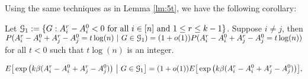 \documentclass{article}
\begin{document}
Using the same techniques as in Lemma \ref{lm:5t}, we have the following corollary:
\begin{corollary}\label{lem:ucBA}
Let $\mathcal{G}_1:=\{G:A^r_i-A^0_i<0\text{~for all~}i\in[n] \text{ and } 1\leq r \leq k-1\}$. Suppose $i\neq j$, then $P(A^r_i-A^0_i + A^r_j - A^0_j= t\log(n)~|~G\in\mathcal{G}_1)= (1+o(1))P(A^r_i-A^0_i + A^r_j - A^0_j= t\log(n))$ for all $t<0$ such that $t\log(n)$ is an integer.
\end{corollary}
\begin{lemma}\label{lem:BijG}
\begin{equation} 
E \big[  \exp\big(k\beta (A^r_i-A^0_i + A^r_j - A^0_j) \big) ~\big|~ G\in\mathcal{G}_1 \big] 
= (1+o(1)) E \big[  \exp\big(k\beta (A^r_i-A^0_i + A^r_j - A^0_j) \big) \big] ,
\end{equation}
\end{lemma}
\end{document}
